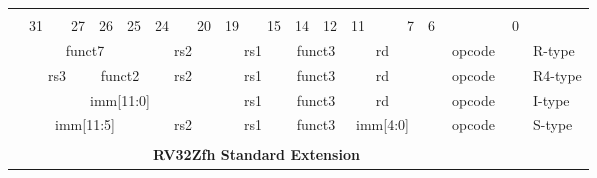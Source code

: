 \begin{table}[p]
\begin{small}
\begin{center}
    \begin{tabular} {p{0.002in}p{0.002in}p{0.002in}p{0.002in}p{0.002in}p{0.002in}p{0.002in}p{0.002in}p{0.002in}p{0.002in}p{0.002in}p{0.002in}p{0.002in}p{0.002in}p{0.002in}p{0.002in}p{0.002in}p{0.002in}p{0.002in}p{0.002in}p{0.002in}p{0.002in}p{0.002in}p{0.002in}p{0.002in}p{0.002in}p{0.002in}p{0.002in}p{0.002in}p{0.002in}p{0.002in}p{0.002in}p{0.002in}l}
    & & & & & & & & & & & & & & & & & & & & & & & & & & & & & & & & \\

            &

    \multicolumn{3}{l}{31} &
    \multicolumn{2}{r}{27} &
    \multicolumn{1}{c}{26} &
    \multicolumn{1}{r}{25} &
    \multicolumn{3}{l}{24} &
    \multicolumn{2}{r}{20} &
    \multicolumn{3}{l}{19} &
    \multicolumn{2}{r}{15} &
    \multicolumn{2}{l}{14} &
    \multicolumn{1}{r}{12} &
    \multicolumn{4}{l}{11} &
    \multicolumn{1}{r}{7} &
    \multicolumn{6}{l}{6} &
    \multicolumn{1}{r}{0} \\
    \cline{2-33}
&


\multicolumn{7}{|c|}{funct7} &
\multicolumn{5}{c|}{rs2} &
\multicolumn{5}{c|}{rs1} &
\multicolumn{3}{c|}{funct3} &
\multicolumn{5}{c|}{rd} &
\multicolumn{7}{|c|}{opcode} & R-type \\
\cline{2-33}
&

\multicolumn{5}{|c|}{rs3} &
\multicolumn{2}{c|}{funct2} &
\multicolumn{5}{c|}{rs2} &
\multicolumn{5}{c|}{rs1} &
\multicolumn{3}{c|}{funct3} &
\multicolumn{5}{c|}{rd} &
\multicolumn{7}{|c|}{opcode} & R4-type \\
\cline{2-33}
&

\multicolumn{12}{|c|}{imm[11:0]} &
\multicolumn{5}{c|}{rs1} &
\multicolumn{3}{c|}{funct3} &
\multicolumn{5}{c|}{rd} &
\multicolumn{7}{|c|}{opcode} & I-type \\
\cline{2-33}
&

\multicolumn{7}{|c|}{imm[11:5]} &
\multicolumn{5}{c|}{rs2} &
\multicolumn{5}{c|}{rs1} &
\multicolumn{3}{c|}{funct3} &
\multicolumn{5}{c|}{imm[4:0]} &
\multicolumn{7}{|c|}{opcode} & S-type \\
\cline{2-33}
&




\multicolumn{32}{c}{} & \\
\multicolumn{32}{c}{\bfseries RV32Zfh Standard Extension } & \\
\cline{2-33}


\end{tabular}
\end{center}
\end{small}
\end{table}

